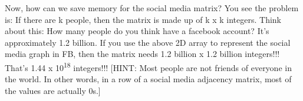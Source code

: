Now, how can we save memory for the social media matrix? You see the problem is: If there are k people, then the matrix is made up of k x k integers. Think about this: How many people do you think have a facebook account? It's approximately 1.2 billion. If you use the above 2D array to represent the social media graph in FB, then the matrix needs 1.2 billion x 1.2 billion integers!!! That's 1.44 x 10\textsuperscript{18} integers!!! [HINT: Most people are not friends of everyone in the world. In other words, in a row of a social media adjacency matrix, most of the values are actually 0s.]

